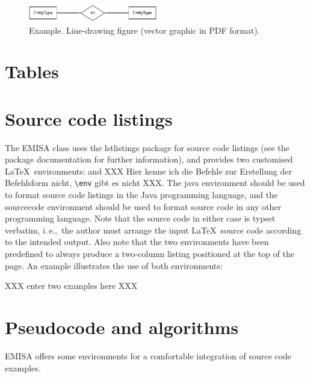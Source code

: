 \documentclass[a4paper]{ltxdoc}
\providecommand*\pkg[1]{\textsf{#1}}
\begin{document}
\begin{figure}[htbp]
\begin{center}
\includegraphics[width=0.5\textwidth]{vector}
\caption{Example. Line-drawing figure (vector graphic in PDF format).}
\label{default}
\end{center}
\end{figure}








\section{Tables}






\section{Source code listings}
The \pkg{EMISA} class uses the \pkg{lstlistings} package for source code listings (see the package documentation for further information), and provides two customised \LaTeX\ environments:  and  XXX Hier kenne ich die Befehle zur Erstellung der Befehlsform nicht, \verb|\env| gibt es nicht XXX. The java environment should be used to format source code listings in the Java programming language, and the sourcecode environment should be used to format source code in any other programming language. Note that the source code in either case is typset verbatim, i.\,e.,\ the author must arrange the input \LaTeX\ source code according to the intended output. Also note that the two environments have been predefined to always produce a two-column listing positioned at the top of the page. An example illustrates the use of both environments:

XXX enter two examples here XXX




\section{Pseudocode and algorithms}
\pkg{EMISA} offers some environments for a comfortable integration of source code examples.
\end{document}
